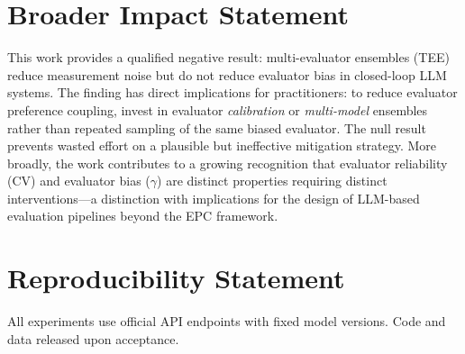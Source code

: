 \documentclass[11pt]{article}
\begin{document}
\section*{Broader Impact Statement}

This work provides a qualified negative result: multi-evaluator ensembles (TEE) reduce measurement noise but do not reduce evaluator bias in closed-loop LLM systems. The finding has direct implications for practitioners: to reduce evaluator preference coupling, invest in evaluator \textit{calibration} or \textit{multi-model} ensembles rather than repeated sampling of the same biased evaluator. The null result prevents wasted effort on a plausible but ineffective mitigation strategy. More broadly, the work contributes to a growing recognition that evaluator reliability (CV) and evaluator bias ($\gamma$) are distinct properties requiring distinct interventions---a distinction with implications for the design of LLM-based evaluation pipelines beyond the EPC framework.

\section*{Reproducibility Statement}
All experiments use official API endpoints with fixed model versions. Code and data released upon acceptance.
\end{document}
